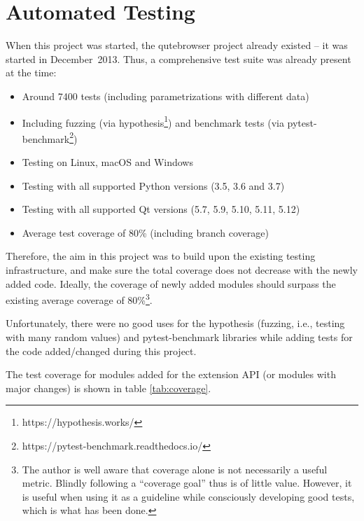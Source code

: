 \section{Automated Testing}
When this project was started, the qutebrowser project already existed -- it was
started in December~2013. Thus, a comprehensive test suite was already present
at the time:

\begin{itemize}[parsep=5pt]
  \item Around 7400 tests (including parametrizations with different data)
  \item Including fuzzing (via hypothesis\footnote{https://hypothesis.works/})
    and benchmark tests (via pytest-benchmark\footnote{https://pytest-benchmark.readthedocs.io/})
  \item Testing on Linux, macOS and Windows
  \item Testing with all supported Python versions (3.5, 3.6 and 3.7)
  \item Testing with all supported Qt versions (5.7, 5.9, 5.10, 5.11, 5.12)
  \item Average test coverage of 80\% (including branch coverage)
\end{itemize}

Therefore, the aim in this project was to build upon the existing testing
infrastructure, and make sure the total coverage does not decrease with the
newly added code. Ideally, the coverage of newly added modules should surpass
the existing average coverage of 80\%\footnote{The author is well aware that
  coverage alone is not necessarily a useful metric. Blindly following a
  ``coverage goal'' thus is of little value. However, it is useful when using it
  as a guideline while consciously developing good tests, which is what has been
  done.}.

Unfortunately, there were no good uses for the hypothesis (fuzzing, i.e.,
testing with many random values) and pytest-benchmark libraries while adding
tests for the code added/changed during this project.

The test coverage for modules added for the extension API (or modules with major
changes) is shown in table \ref{tab:coverage}.

